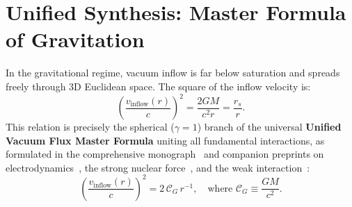 \documentclass[11pt,a4paper]{article}
\begin{document}
\section{Unified Synthesis: Master Formula of Gravitation}
\label{sec:ana_formul_kutlecekim}

In the gravitational regime, vacuum inflow is far below saturation and spreads freely through 3D Euclidean space. The square of the inflow velocity is:
\begin{equation}
    \left( \frac{v_{\mathrm{inflow}}(r)}{c} \right)^2 = \frac{2GM}{c^2 r} = \frac{r_s}{r}.
    \label{eq:kutlecekim_master}
\end{equation}
This relation is precisely the spherical ($\gamma = 1$) branch of the universal \textbf{Unified Vacuum Flux Master Formula} uniting all fundamental interactions, as formulated in the comprehensive monograph~\cite{main_paper} and companion preprints on electrodynamics~\cite{paper2}, the strong nuclear force~\cite{paper3}, and the weak interaction~\cite{paper4}:
\begin{equation}
    \boxed{ \left( \frac{v_{\mathrm{inflow}}(r)}{c} \right)^2 = 2 \, \mathcal{C}_G \, r^{-1}, \quad \text{where } \mathcal{C}_G \equiv \frac{GM}{c^2}. }
\end{equation}
\end{document}
